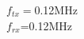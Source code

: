 \documentclass[preview]{standalone}
\begin{document}
\begin{center}
$f_{tx}=$0.12MHz\\$f_{rx}$=0.12MHz
\end{center}
\end{document}
